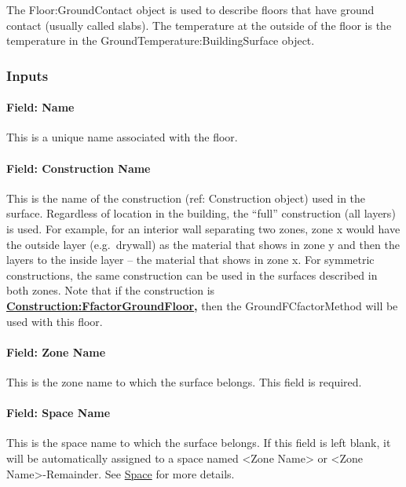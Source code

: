 The Floor:GroundContact object is used to describe floors that have ground contact (usually called slabs). The temperature at the outside of the floor is the temperature in the GroundTemperature:BuildingSurface object.

\subsubsection{Inputs}\label{inputs-11-021}

\paragraph{Field: Name}\label{field-name-7-022}

This is a unique name associated with the floor.

\paragraph{Field: Construction Name}\label{field-construction-name-7}

This is the name of the construction (ref: Construction object) used in the surface. Regardless of location in the building, the ``full'' construction (all layers) is used. For example, for an interior wall separating two zones, zone x would have the outside layer (e.g.~drywall) as the material that shows in zone y and then the layers to the inside layer -- the material that shows in zone x. For symmetric constructions, the same construction can be used in the surfaces described in both zones. Note that if the construction is \textbf{\hyperref[constructionffactorgroundfloor]{Construction:FfactorGroundFloor},} then the GroundFCfactorMethod will be used with this floor.

\paragraph{Field: Zone Name}\label{field-zone-name-7-004}

This is the zone name to which the surface belongs. This field is required.

\paragraph{Field: Space Name}\label{field-space-name-7-004}

This is the space name to which the surface belongs. If this field is left blank, it will be automatically assigned to a space named <Zone Name> or <Zone Name>-Remainder. See \hyperref[space]{Space} for more details.

